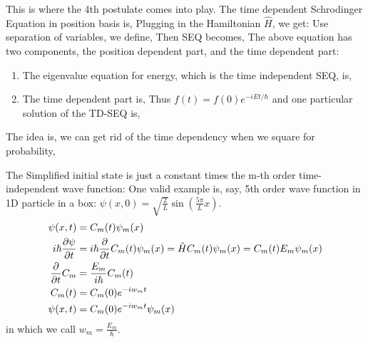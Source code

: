 \documentclass{school-22.101-notes}
\date{October 3, 2011}
\begin{document}
\maketitle

This is where the 4th postulate comes into play. The time dependent Schrodinger Equation in position basis is, 
Plugging in the Hamiltonian $\hat{H}$, we get: 
Use separation of variables, we define, 
Then SEQ becomes, 
The above equation has two components, the position dependent part, and the time dependent part: 
\begin{enumerate}
\item The eigenvalue equation for energy, which is the time independent SEQ, is, 
\item The time dependent part is, 
  Thus $f(t) = f(0) e^{-iEt/\hbar}$ and one particular solution of the TD-SEQ is, 
\end{enumerate}




\clearpage
{}
The idea is, we can get rid of the time dependency when we square for probability, 


The Simplified initial state is just a constant times the m-th order time-independent wave function:
One valid example is, say, 5th order wave function in 1D particle in a box: $\psi(x,0) = \sqrt{\frac{2}{L}} \sin \left( \frac{5 \pi}{L} x\right).$
\begin{align}
\psi(x,t) &= C_m(t) \psi_m(x) \\
i \hbar \frac{\partial \psi}{\partial t} &= i \hbar \frac{\partial}{\partial t} C_m (t) \psi_m (x) = \hat{H} C_m (t) \psi_m (x) = C_m (t) E_m \psi_m (x) \\
\frac{\partial}{\partial t} C_m &= \frac{E_m}{i\hbar} C_m (t) \\
C_m (t) &= C_m(0) e^{-i w_m t} \\
\psi(x,t) &= C_m(0) e^{-i w_m t} \psi_m (x) 
\end{align}
in which we call $w_m = \frac{E_m}{\hbar}$. 
\end{document}
